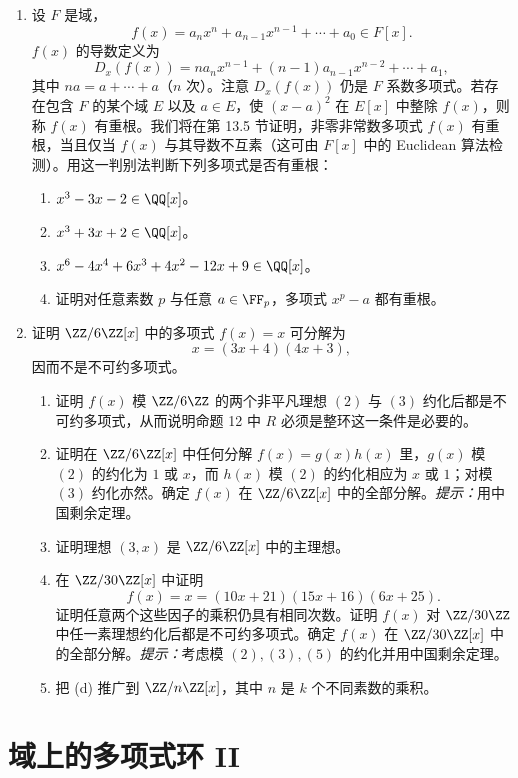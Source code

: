 \begin{enumerate}[label=\arabic*.]
	\item 设 $F$ 是域，
	\[
	f(x)=a_nx^n+a_{n-1}x^{n-1}+\cdots+a_0\in F[x].
	\]
	$f(x)$ 的导数定义为
	\[
	D_x(f(x))=n a_nx^{n-1}+(n-1)a_{n-1}x^{n-2}+\cdots+a_1,
	\]
	其中 $na=a+\cdots+a$（$n$ 次）。注意 $D_x(f(x))$ 仍是 $F$ 系数多项式。若存在包含 $F$ 的某个域 $E$ 以及 $a\in E$，使 $(x-a)^2$ 在 $E[x]$ 中整除 $f(x)$，则称 $f(x)$ 有重根。我们将在第 13.5 节证明，非零非常数多项式 $f(x)$ 有重根，当且仅当 $f(x)$ 与其导数不互素（这可由 $F[x]$ 中的 Euclidean 算法检测）。用这一判别法判断下列多项式是否有重根：
	\begin{enumerate}[label=(\alph*)]
		\item $x^3-3x-2\in\QQ[x]$。
		\item $x^3+3x+2\in\QQ[x]$。
		\item $x^6-4x^4+6x^3+4x^2-12x+9\in\QQ[x]$。
		\item 证明对任意素数 $p$ 与任意 $a\in\FF_p$，多项式 $x^p-a$ 都有重根。
	\end{enumerate}
	
	\item 证明 $\ZZ/6\ZZ[x]$ 中的多项式 $f(x)=x$ 可分解为
	\[
	x=(3x+4)(4x+3),
	\]
	因而不是不可约多项式。
	\begin{enumerate}[label=(\alph*)]
		\item 证明 $f(x)$ 模 $\ZZ/6\ZZ$ 的两个非平凡理想 $(2)$ 与 $(3)$ 约化后都是不可约多项式，从而说明命题 12 中 $R$ 必须是整环这一条件是必要的。
		\item 证明在 $\ZZ/6\ZZ[x]$ 中任何分解 $f(x)=g(x)h(x)$ 里，$g(x)$ 模 $(2)$ 的约化为 $1$ 或 $x$，而 $h(x)$ 模 $(2)$ 的约化相应为 $x$ 或 $1$；对模 $(3)$ 约化亦然。确定 $f(x)$ 在 $\ZZ/6\ZZ[x]$ 中的全部分解。\emph{提示：}用中国剩余定理。
		\item 证明理想 $(3,x)$ 是 $\ZZ/6\ZZ[x]$ 中的主理想。
		\item 在 $\ZZ/30\ZZ[x]$ 中证明
		\[
		f(x)=x=(10x+21)(15x+16)(6x+25).
		\]
		证明任意两个这些因子的乘积仍具有相同次数。证明 $f(x)$ 对 $\ZZ/30\ZZ$ 中任一素理想约化后都是不可约多项式。确定 $f(x)$ 在 $\ZZ/30\ZZ[x]$ 中的全部分解。\emph{提示：}考虑模 $(2),(3),(5)$ 的约化并用中国剩余定理。
		\item 把 (d) 推广到 $\ZZ/n\ZZ[x]$，其中 $n$ 是 $k$ 个不同素数的乘积。
	\end{enumerate}
\end{enumerate}

\section{域上的多项式环 II}

